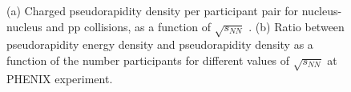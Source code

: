 \begin{figure}
  \centering
  \quad
  \caption{(a) Charged pseudorapidity density per participant pair for nucleus-nucleus and pp collisions, as a function of $\sqrt{s_{NN}}$ \cite{multen}. (b) Ratio between pseudorapidity energy density and pseudorapidity density as a function of the number participants for different values of $\sqrt{s_{NN}}$ at PHENIX experiment.}
\end{figure}
